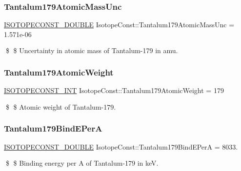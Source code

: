 \subsubsection{\texorpdfstring{Tantalum179\+Atomic\+Mass\+Unc}{Tantalum179AtomicMassUnc}}
{\footnotesize\ttfamily \mbox{\hyperlink{group___isotope_const-_macros_ga8f45a7272ce02c0b4c65c44636ed719a}{I\+S\+O\+T\+O\+P\+E\+C\+O\+N\+S\+T\+\_\+\+D\+O\+U\+B\+LE}} Isotope\+Const\+::\+Tantalum179\+Atomic\+Mass\+Unc = 1.\+571e-\/06}

\$ \$ Uncertainty in atomic mass of Tantalum-\/179 in amu. \mbox{\label{group___isotope_const-_tantalum-_ta179_ga215ea7c4e8f2af7261e14c34d87dc3d2}} 
\subsubsection{\texorpdfstring{Tantalum179\+Atomic\+Weight}{Tantalum179AtomicWeight}}
{\footnotesize\ttfamily \mbox{\hyperlink{group___isotope_const-_macros_ga5f18360b3e99483a35c32d789e62621c}{I\+S\+O\+T\+O\+P\+E\+C\+O\+N\+S\+T\+\_\+\+I\+NT}} Isotope\+Const\+::\+Tantalum179\+Atomic\+Weight = 179}

\$ \$ Atomic weight of Tantalum-\/179. \mbox{\label{group___isotope_const-_tantalum-_ta179_ga50b5359c38f7a123eafeb2bda1c9313d}} 
\subsubsection{\texorpdfstring{Tantalum179\+Bind\+E\+PerA}{Tantalum179BindEPerA}}
{\footnotesize\ttfamily \mbox{\hyperlink{group___isotope_const-_macros_ga8f45a7272ce02c0b4c65c44636ed719a}{I\+S\+O\+T\+O\+P\+E\+C\+O\+N\+S\+T\+\_\+\+D\+O\+U\+B\+LE}} Isotope\+Const\+::\+Tantalum179\+Bind\+E\+PerA = 8033.}

\$ \$ Binding energy per A of Tantalum-\/179 in keV. \mbox{\label{group___isotope_const-_tantalum-_ta179_gafcf29659974fbe696f2d920fe7c997d2}} 

